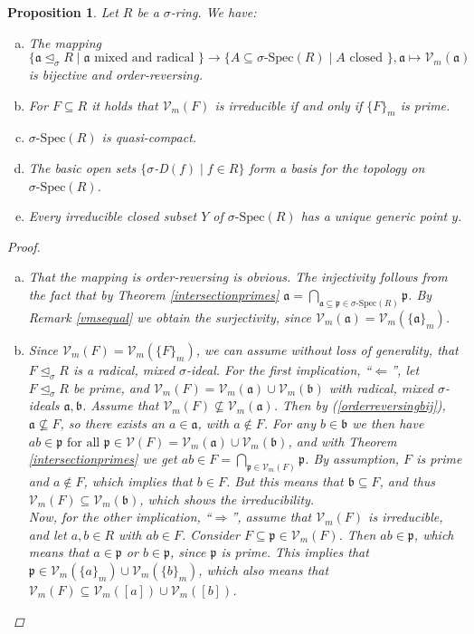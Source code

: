 \documentclass{article}
\def\Vm{\mathcal{V}_m}
\def\V{\mathcal{V}}
\def\a{\mathfrak{a}}
\def\b{\mathfrak{b}}
\def\p{\mathfrak{p}}
\def\s{\sigma}
\def\si{\unlhd_{\sigma}}
\def\sSpec{\sigma\text{-Spec}}
\def\fa{\text{ for all }}
\newenvironment{bew}{\begin{proof}[Proof]}{\end{proof}}
\theoremstyle{plain}
\newtheorem{prop}[Satz]{Proposition}
\theoremstyle{definition}
\begin{document}
\begin{prop}
Let $R$ be a $\s$-ring. We have:
\begin{enumerate}[(a)]
\item \label{vmbijection} The mapping 
$$\{ \a \si R \mid \a\text{ mixed and radical }\} \rightarrow \{ A \subseteq \sSpec(R) \mid A \text{ closed }\}, \a \mapsto \Vm(\a)$$
 is bijective and order-reversing.
\item \label{irred=prime} For $F \subseteq R$ it holds that $\Vm(F)$ is irreducible if and only if $\{F\}_m$ is prime.
\item $\sSpec(R)$ is quasi-compact.
\item The basic open sets $\{ \s$-D$(f) \mid f \in R \}$ form a basis for the topology on $\sSpec(R)$.
\item Every irreducible closed subset $Y$ of $\sSpec(R)$ has a unique generic point $y$.
\end{enumerate}
\begin{bew}
\begin{enumerate}[(a)]
\item \label{orderreversingbij} That the mapping is order-reversing is obvious. The injectivity follows from the fact that by Theorem \ref{intersectionprimes} $\a = \bigcap_{\a \subseteq \p \in \sSpec(R)} \p$. By Remark \ref{vmsequal} we obtain the surjectivity,
 since $\Vm(\a) = \Vm(\{\a\}_m)$.
\item Since $\Vm(F) = \Vm(\{F\}_m)$, we can assume without loss of generality, that $F \si R$ is a radical, mixed $\s$-ideal.
For the first implication, ``$\Leftarrow$'', let $F \si R$ be prime, and $\Vm(F) = \Vm(\a) \cup \Vm(\b)$ with radical, mixed $\s$-ideals $\a, \b$. Assume that $\Vm(F) \not\subseteq \Vm(\a)$. Then by (\ref{orderreversingbij}), $\a \not \subseteq F$, so there exists an $a \in \a$, with $a \notin F$.
For any $b \in \b$ we then have $ab \in \p \fa \p \in \V(F) = \Vm(\a) \cup \Vm(\b)$, and with Theorem \ref{intersectionprimes} we get $ab \in F = \bigcap_{\p \in \Vm(F)}\p$. By assumption, $F$ is prime and $a \notin F$, which implies
 that  $b \in F$. But this means that $\b \subseteq F$, and thus $\Vm(F) \subseteq \Vm(\b)$, which shows the irreducibility. \\
\indent Now, for the other implication, ``$\Rightarrow$'', assume that $\Vm(F)$ is irreducible, and let $a,b \in R$ with $ab \in F$. Consider $F \subseteq \p \in \Vm(F)$. Then $ab \in \p$, 
which means that $a \in \p$ or $b \in \p$, since $\p$ is prime. This implies that $\p \in \Vm(\{a\}_m) \cup \Vm(\{b\}_m)$, which also means that $\Vm(F) \subseteq \Vm([a]) \cup \Vm([b])$.

\end{enumerate}
\end{bew}
\end{prop}
\end{document}
